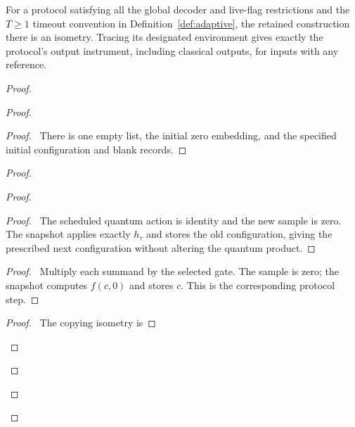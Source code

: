 \begin{lemma}\label{lem:deferred}
For a protocol satisfying all the global decoder and live-flag restrictions
and the $T\geq1$ timeout convention in Definition~\ref{def:adaptive},
the retained construction there is an isometry.
Tracing its designated environment gives exactly the protocol's output
instrument, including classical outputs, for inputs with any reference.
\end{lemma}
\begin{proof}
 \begin{proof}
  \begin{proof}\pf\ There is one empty list, the initial zero embedding,
  and the specified initial configuration and blank records.\end{proof}
\begin{proof}
 \begin{proof}
  \begin{proof}\pf\ The scheduled quantum action is identity and
  the new sample is zero. The snapshot applies exactly $h_\tau$
  and stores the old configuration, giving the prescribed next
  configuration without altering the quantum product.\end{proof}
  \begin{proof}\pf\ Multiply each summand by the selected gate.
  The sample is zero; the snapshot computes $f(c,0)$ and stores $c$.
  This is the corresponding protocol step.\end{proof}
  \begin{proof}\pf\ The copying isometry is

\end{proof}
\end{proof}
\end{proof}
\end{proof}
\end{proof}
